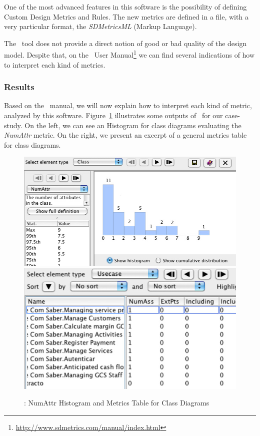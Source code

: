 One of the most advanced features in this software is the possibility of defining Custom Design Metrics and Rules. 
The new metrics are defined in a \xml file, with a very particular format, the \emph{SDMetricsML} (\sdmetrics Markup Language).

The \sdmetrics\ tool does not provide a direct notion of good or bad quality of the design model. 
Despite that, on the \sdmetrics\ User Manual\footnote{\url{http://www.sdmetrics.com/manual/index.html}} we can find several indications of how to interpret each kind of metrics. 
 
\subsubsection{Results}
Based on the \sdmetrics\ manual, we will now explain how to interpret each kind of metric, analyzed by this software. 
Figure~\ref{fig:sdmetrics} illustrates some outputs of \sdmetrics\ for our case-study. 
On the left, we can see an Histogram for class diagrams evaluating the \emph{NumAttr} metric. On the right, we present an excerpt of a general metrics table for class diagrams.

\begin{figure}[htbp]
\includegraphics[scale=0.3]{images/histogram2}
\hspace{0.1cm}
\includegraphics[scale=0.32]{images/table3}
\caption{\sdmetrics: \textsf{NumAttr} Histogram and Metrics Table for Class Diagrams}
\label{fig:sdmetrics}
\end{figure}


